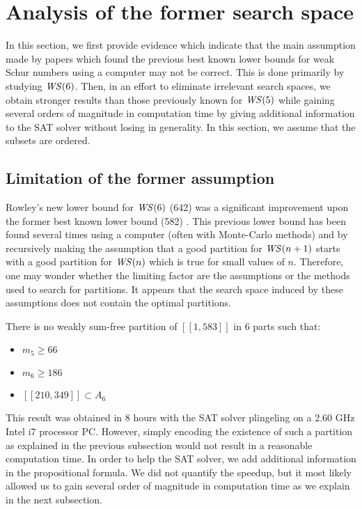 \section{Analysis of the former search space}

\qquad \hypertarget{sat}{In} this section, we first provide evidence which indicate that the main assumption made by papers which
found the previous best known lower bounds for weak Schur numbers using a computer may not be correct. 
This is done primarily by studying \(\mathit{WS}(6)\). Then, in an effort to eliminate irrelevant search spaces, we 
obtain stronger results than those previously known for \(\mathit{WS} (5)\) while gaining several orders of magnitude 
in computation time by giving additional information to the SAT solver without losing in generality. In this 
section, we assume that the subsets are ordered.


\subsection{Limitation of the former assumption}

\qquad Rowley's new lower bound for \(\mathit{WS} (6)\) (642) \cite{RowleyWS} was a significant improvement upon
the former best known lower bound (582) \cite{EliahouBook}. This previous lower bound has been found 
several times using a computer (often with Monte-Carlo methods) and by recursively making the assumption 
that a good partition for \(\mathit{WS} (n+1)\) starts with a good partition for \(\mathit{WS} (n)\) which is true for small
values of \(n\). Therefore, one may wonder whether the limiting factor are the assumptions or the 
methods used to search for partitions. It appears that the search space induced by these assumptions does 
not contain the optimal partitions.

\begin{computational theorem}
There is no weakly sum-free partition of \([\![1,583]\!]\) in 6 parts such that:
\begin{itemize}
	\item \(m_5 \geqslant 66\)
	\item \(m_6 \geqslant 186\)
	\item \([\![210,349]\!] \subset A_6\)
\end{itemize}
\end{computational theorem}

This result was obtained in 8 hours with the SAT solver plingeling \cite{Lingeling2017} on a 2.60 GHz Intel
i7 processor PC.
However, simply encoding the existence of such a partition as explained in the previous subsection would not result in a
reasonable
computation time. In order to help the SAT solver, we add additional information in the propositional formula. We did
not quantify the
speedup, but it most likely allowed us to gain several order of magnitude in computation time as we explain in the next
subsection.

